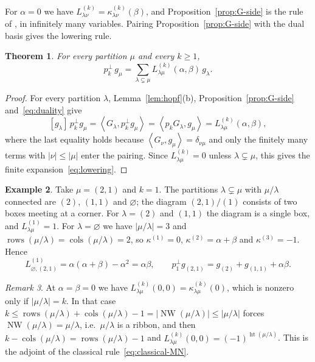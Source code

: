 \documentclass[11pt]{amsart}
\numberwithin{equation}{section}
\newtheorem{theorem}{Theorem}[section]
\theoremstyle{definition}
\newtheorem{example}[theorem]{Example}
\theoremstyle{remark}
\newtheorem{remark}[theorem]{Remark}
\newcommand{\rows}{\operatorname{rows}}
\newcommand{\cols}{\operatorname{cols}}
\newcommand{\NW}{\operatorname{NW}}
\newcommand{\hgt}{\operatorname{ht}}
\newcommand{\Hall}[2]{\left\langle #1,#2\right\rangle}
\newcommand{\one}{\varnothing}
\begin{document}
For $\alpha=0$ we have $L^{(k)}_{\lambda\nu}=\kappa^{(k)}_{\lambda\nu}(\beta)$, and
Proposition~\ref{prop:G-side} is the rule of \cite[Thm.~1.1]{NHST}, in
infinitely many variables. Pairing Proposition~\ref{prop:G-side} with the dual basis gives the lowering rule.

\begin{theorem}\label{thm:lowering}
For every partition $\mu$ and every $k\geq1$,
\begin{equation}\label{eq:lowering}
 p_k^{\perp}\,g_\mu
 =\sum_{\lambda\subsetneq\mu}L^{(k)}_{\lambda\mu}(\alpha,\beta)\,g_\lambda .
\end{equation}
\end{theorem}

\begin{proof}
For every partition $\lambda$, Lemma~\ref{lem:hopf}(b),
Proposition~\ref{prop:G-side} and~\eqref{eq:duality} give
\[
 [g_\lambda]\,p_k^\perp g_\mu
 =\Hall{G_\lambda}{p_k^\perp g_\mu}
 =\Hall{p_kG_\lambda}{g_\mu}
 =L^{(k)}_{\lambda\mu}(\alpha,\beta),
\]
where the last equality holds because $\Hall{G_\nu}{g_\mu}=\delta_{\nu\mu}$
and only the finitely many terms with $|\nu|\leq|\mu|$ enter the pairing. Since $L^{(k)}_{\lambda\mu}=0$ unless $\lambda\subsetneq\mu$, this gives the
finite expansion~\eqref{eq:lowering}.
\end{proof}

\begin{example}\label{ex:lowering}
Take $\mu=(2,1)$ and $k=1$. The partitions $\lambda\subsetneq\mu$ with
$\mu/\lambda$ connected are $(2)$, $(1,1)$ and $\one$; the diagram
$(2,1)/(1)$ consists of two boxes meeting at a corner. For $\lambda=(2)$
and $(1,1)$ the diagram is a single box, and $L^{(1)}_{\lambda\mu}=1$. For
$\lambda=\one$ we have $|\mu/\lambda|=3$ and
$\rows(\mu/\lambda)=\cols(\mu/\lambda)=2$, so $\kappa^{(1)}=0$,
$\kappa^{(2)}=\alpha+\beta$ and $\kappa^{(3)}=-1$. Hence
\[
 L^{(1)}_{\one,(2,1)}=\alpha(\alpha+\beta)-\alpha^2=\alpha\beta,
 \qquad
 p_1^\perp g_{(2,1)}=g_{(2)}+g_{(1,1)}+\alpha\beta .
\]
\end{example}

\begin{remark}\label{rem:lowering-classical}
At $\alpha=\beta=0$ we have $L^{(k)}_{\lambda\mu}(0,0)=\kappa^{(k)}_{\lambda\mu}(0)$,
which is nonzero only if $|\mu/\lambda|=k$. In that case
$k\leq\rows(\mu/\lambda)+\cols(\mu/\lambda)-1=|\NW(\mu/\lambda)| \leq |\mu/\lambda|$ forces $\NW(\mu/\lambda)=\mu/\lambda$,
i.e.\ $\mu/\lambda$ is a ribbon, and then $k-\cols(\mu/\lambda)=\rows(\mu/\lambda)-1$ and
$L^{(k)}_{\lambda\mu}(0,0)=(-1)^{\hgt(\mu/\lambda)}$. This is the adjoint of
the classical rule~\eqref{eq:classical-MN}.
\end{remark}
\end{document}
